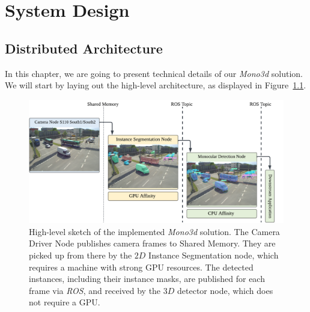 
\chapter{System Design}
\label{ch:system}

\section{Distributed Architecture}
\label{sec:arch}

In this chapter, we are going to present technical details of our  \textit{Mono3d} solution.
We will start by laying out the high-level architecture, as displayed in Figure~\ref{fig:mono3d-highlevel}.

\begin{figure}[htb]
    \centering
    \includegraphics[width=\linewidth]{figures/mono3d-pipeline-highlevel}
    \caption{High-level sketch of the implemented \textit{Mono3d} solution. The Camera Driver Node publishes camera frames to Shared Memory. They are picked up from there by the $2D$ Instance Segmentation node, which requires a machine with strong GPU resources. The detected instances, including their instance masks, are published for each frame via \textit{ROS}, and received by the $3D$ detector node, which does not require a GPU.}
    \label{fig:mono3d-highlevel}
\end{figure}

